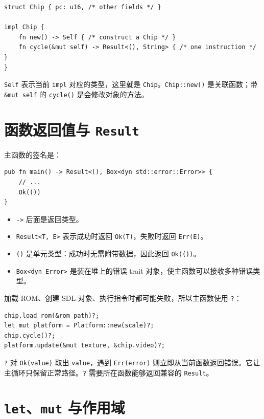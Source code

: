 \documentclass[UTF8,11pt,a4paper]{ctexart}
\begin{document}
\begin{lstlisting}
struct Chip { pc: u16, /* other fields */ }

impl Chip {
    fn new() -> Self { /* construct a Chip */ }
    fn cycle(&mut self) -> Result<(), String> { /* one instruction */ }
}
\end{lstlisting}

\texttt{Self} 表示当前 \texttt{impl} 对应的类型，这里就是 \texttt{Chip}。\texttt{Chip::new()} 是关联函数；带 \texttt{\&mut self} 的 \texttt{cycle()} 是会修改对象的方法。

\section{函数返回值与 \texttt{Result}}

主函数的签名是：

\begin{lstlisting}
pub fn main() -> Result<(), Box<dyn std::error::Error>> {
    // ...
    Ok(())
}
\end{lstlisting}

\begin{itemize}
  \item \texttt{->} 后面是返回类型。
  \item \texttt{Result<T, E>} 表示成功时返回 \texttt{Ok(T)}，失败时返回 \texttt{Err(E)}。
  \item \texttt{()} 是单元类型：成功时无需附带数据，因此返回 \texttt{Ok(())}。
  \item \texttt{Box<dyn Error>} 是装在堆上的错误 trait 对象，使主函数可以接收多种错误类型。
\end{itemize}

加载 ROM、创建 SDL 对象、执行指令时都可能失败，所以主函数使用 \texttt{?}：

\begin{lstlisting}
chip.load_rom(&rom_path)?;
let mut platform = Platform::new(scale)?;
chip.cycle()?;
platform.update(&mut texture, &chip.video)?;
\end{lstlisting}

\texttt{?} 对 \texttt{Ok(value)} 取出 \texttt{value}，遇到 \texttt{Err(error)} 则立即从当前函数返回错误。它让主循环只保留正常路径。\texttt{?} 需要所在函数能够返回兼容的 \texttt{Result}。

\section{\texttt{let}、\texttt{mut} 与作用域}
\end{document}
